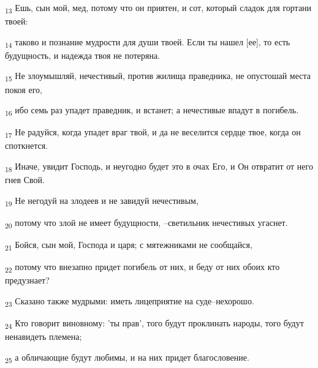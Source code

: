 \begin{tcolorbox}
\textsubscript{13} Ешь, сын мой, мед, потому что он приятен, и сот, который сладок для гортани твоей:
\end{tcolorbox}
\begin{tcolorbox}
\textsubscript{14} таково и познание мудрости для души твоей. Если ты нашел [ее], то есть будущность, и надежда твоя не потеряна.
\end{tcolorbox}
\begin{tcolorbox}
\textsubscript{15} Не злоумышляй, нечестивый, против жилища праведника, не опустошай места покоя его,
\end{tcolorbox}
\begin{tcolorbox}
\textsubscript{16} ибо семь раз упадет праведник, и встанет; а нечестивые впадут в погибель.
\end{tcolorbox}
\begin{tcolorbox}
\textsubscript{17} Не радуйся, когда упадет враг твой, и да не веселится сердце твое, когда он споткнется.
\end{tcolorbox}
\begin{tcolorbox}
\textsubscript{18} Иначе, увидит Господь, и неугодно будет это в очах Его, и Он отвратит от него гнев Свой.
\end{tcolorbox}
\begin{tcolorbox}
\textsubscript{19} Не негодуй на злодеев и не завидуй нечестивым,
\end{tcolorbox}
\begin{tcolorbox}
\textsubscript{20} потому что злой не имеет будущности, --светильник нечестивых угаснет.
\end{tcolorbox}
\begin{tcolorbox}
\textsubscript{21} Бойся, сын мой, Господа и царя; с мятежниками не сообщайся,
\end{tcolorbox}
\begin{tcolorbox}
\textsubscript{22} потому что внезапно придет погибель от них, и беду от них обоих кто предузнает?
\end{tcolorbox}
\begin{tcolorbox}
\textsubscript{23} Сказано также мудрыми: иметь лицеприятие на суде--нехорошо.
\end{tcolorbox}
\begin{tcolorbox}
\textsubscript{24} Кто говорит виновному: 'ты прав', того будут проклинать народы, того будут ненавидеть племена;
\end{tcolorbox}
\begin{tcolorbox}
\textsubscript{25} а обличающие будут любимы, и на них придет благословение.
\end{tcolorbox}
